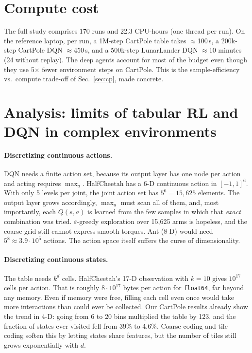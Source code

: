 \section{Compute cost}
The full study comprises 170 runs and 22.3 CPU-hours (one thread per run). On the reference laptop, per
run, a 1M-step CartPole table takes $\approx$100\,s, a 200k-step CartPole DQN $\approx$450\,s, and a
500k-step LunarLander DQN $\approx$10 minutes (24 without replay). The deep agents account for most of
the budget even though they use 5$\times$ fewer environment steps on CartPole. This is the
sample-efficiency vs.\ compute trade-off of Sec.~\ref{sec:cp}, made concrete.


\section{Analysis: limits of tabular RL and DQN in complex environments}
\label{sec:theory}
\paragraph{Discretizing continuous actions.} DQN needs a finite action set, because its output layer has
one node per action and acting requires $\max_a$. HalfCheetah has a 6-D continuous action in $[-1,1]^6$.
With only 5 levels per joint, the joint action set has $5^6=15{,}625$ elements. The output layer grows
accordingly, $\max_a$ must scan all of them, and, most importantly, each $Q(s,a)$ is learned from the
few samples in which that \emph{exact} combination was tried. $\varepsilon$-greedy exploration over
15{,}625 arms is hopeless, and the coarse grid still cannot express smooth torques. Ant (8-D) would need
$5^8\approx3.9\cdot10^5$ actions. The action space itself suffers the curse of dimensionality.

\paragraph{Discretizing continuous states.} The table needs $k^{d}$ cells. HalfCheetah's 17-D observation
with $k=10$ gives $10^{17}$ cells per action. That is roughly $8\cdot10^{17}$ bytes per action for
\texttt{float64}, far beyond any memory. Even if memory were free, filling each cell even once would
take more interactions than could ever be collected. Our CartPole results already show the trend in
4-D: going from 6 to 20 bins multiplied the table by 123, and the fraction of states ever visited fell
from 39\% to 4.6\%. Coarse coding and tile coding \citep[Ch.~9]{sutton2018} soften this by letting
states share features, but the number of tiles still grows exponentially with $d$.

